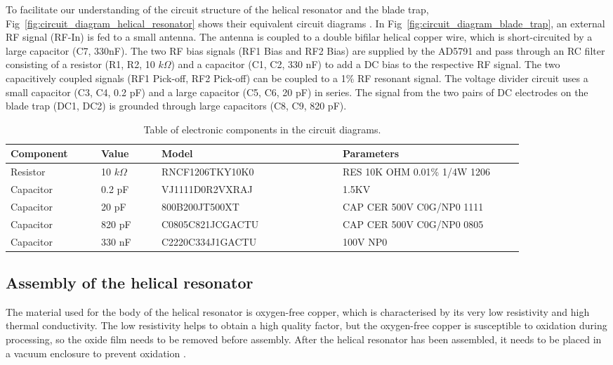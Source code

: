 To facilitate our understanding of the circuit structure of the helical resonator and the blade trap, Fig~\ref{fig:circuit_diagram_helical_resonator} shows their equivalent circuit diagrams \cite{RN335,RN338}. In Fig~\ref{fig:circuit_diagram_blade_trap}, an external RF signal (RF-In) is fed to a small antenna. The antenna is coupled to a double bifilar helical copper wire, which is short-circuited by a large capacitor (C7, 330nF). The two RF bias signals (RF1 Bias and RF2 Bias) are supplied by the AD5791 and pass through an RC filter consisting of a resistor (R1, R2, 10 $k\Omega$) and a capacitor (C1, C2, 330 nF) to add a DC bias to the respective RF signal. The two capacitively coupled signals (RF1 Pick-off, RF2 Pick-off) can be coupled to a 1\% RF resonant signal. The voltage divider circuit uses a small capacitor (C3, C4, 0.2 pF) and a large capacitor (C5, C6, 20 pF) in series. The signal from the two pairs of DC electrodes on the blade trap (DC1, DC2) is grounded through large capacitors (C8, C9, 820 pF).

\begin{table}
    \centering
    \caption{Table of electronic components in the circuit diagrams.}
    \begin{tabular}{p{0.15\linewidth}p{0.1\linewidth}p{0.3\linewidth}p{0.3\linewidth}}
        \toprule
        Component & Value        & Model            & Parameters                   \\
        \midrule
        Resistor  & 10 $k\Omega$ & RNCF1206TKY10K0  & RES 10K OHM 0.01\% 1/4W 1206 \\
        Capacitor & 0.2 pF       & VJ1111D0R2VXRAJ  & 1.5KV                        \\
        Capacitor & 20 pF        & 800B200JT500XT   & CAP CER  500V C0G/NP0 1111
        \\
        Capacitor & 820 pF       & C0805C821JCGACTU & CAP CER  500V C0G/NP0 0805   \\
        Capacitor & 330 nF       & C2220C334J1GACTU & 100V NP0
        \\
        \bottomrule
    \end{tabular}
\end{table}

\subsection{Assembly of the helical resonator}

The material used for the body of the helical resonator is oxygen-free copper, which is characterised by its very low resistivity and high thermal conductivity. The low resistivity helps to obtain a high quality factor, but the oxygen-free copper is susceptible to oxidation during processing, so the oxide film needs to be removed before assembly. After the helical resonator has been assembled, it needs to be placed in a vacuum enclosure to prevent oxidation \cite{RN333,RN337}.

